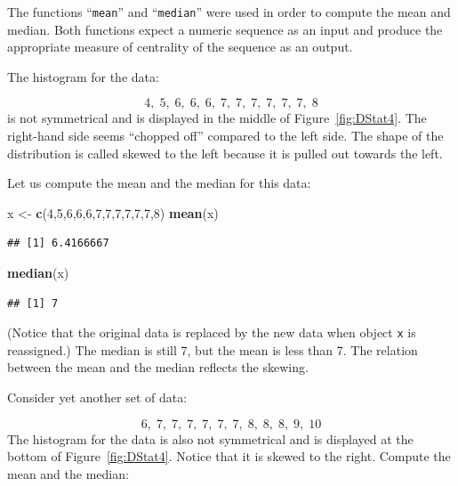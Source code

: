 \documentclass[]{krantz}
\makeatletter
\newenvironment{Shaded}{\begin{snugshade}}{\end{snugshade}}
\newcommand{\DecValTok}[1]{\textcolor[rgb]{0.00,0.00,0.81}{#1}}
\newcommand{\KeywordTok}[1]{\textcolor[rgb]{0.13,0.29,0.53}{\textbf{#1}}}
\newcommand{\NormalTok}[1]{#1}
\newcommand{\StringTok}[1]{\textcolor[rgb]{0.31,0.60,0.02}{#1}}
\newenvironment{kframe}{%
\medskip{}
\setlength{\fboxsep}{.8em}
 \def\at@end@of@kframe{}%
 \ifinner\ifhmode%
  \def\at@end@of@kframe{\end{minipage}}%
  \begin{minipage}{\columnwidth}%
 \fi\fi%
 \def\FrameCommand##1{\hskip\@totalleftmargin \hskip-\fboxsep
 \colorbox{shadecolor}{##1}\hskip-\fboxsep
     \hskip-\linewidth \hskip-\@totalleftmargin \hskip\columnwidth}%
 \MakeFramed {\advance\hsize-\width
   \@totalleftmargin\z@ \linewidth\hsize
   \@setminipage}}%
 {\par\unskip\endMakeFramed%
 \at@end@of@kframe}
\renewenvironment{Shaded}{\begin{kframe}}{\end{kframe}}
\theoremstyle{definition}
\theoremstyle{definition}
\theoremstyle{definition}
\theoremstyle{remark}
\makeatother
\begin{document}
The functions ``\texttt{mean}'' and ``\texttt{median}'' were used in order to compute the
mean and median. Both functions expect a numeric sequence as an input
and produce the appropriate measure of centrality of the sequence as an
output.

The histogram for the data:

\[4,\;  5,\;  6,\;  6,\;  6,\;  7,\;  7,\;  7,\;  7,\;  7,\;  7,\;  8\]
is not symmetrical and is displayed in the middle of
Figure~\ref{fig:DStat4}. The right-hand side seems ``chopped
off'' compared to the left side. The shape of the distribution is called
skewed to the left because it is pulled out towards the left.

Let us compute the mean and the median for this data:

\begin{Shaded}
\begin{Highlighting}[]
\NormalTok{x <-}\StringTok{ }\KeywordTok{c}\NormalTok{(}\DecValTok{4}\NormalTok{,}\DecValTok{5}\NormalTok{,}\DecValTok{6}\NormalTok{,}\DecValTok{6}\NormalTok{,}\DecValTok{6}\NormalTok{,}\DecValTok{7}\NormalTok{,}\DecValTok{7}\NormalTok{,}\DecValTok{7}\NormalTok{,}\DecValTok{7}\NormalTok{,}\DecValTok{7}\NormalTok{,}\DecValTok{7}\NormalTok{,}\DecValTok{8}\NormalTok{)}
\KeywordTok{mean}\NormalTok{(x)}
\end{Highlighting}
\end{Shaded}

\begin{verbatim}
## [1] 6.4166667
\end{verbatim}

\begin{Shaded}
\begin{Highlighting}[]
\KeywordTok{median}\NormalTok{(x)}
\end{Highlighting}
\end{Shaded}

\begin{verbatim}
## [1] 7
\end{verbatim}

(Notice that the original data is replaced by the new data when object
\texttt{x} is reassigned.) The median is still 7, but the mean is less than 7.
The relation between the mean and the median reflects the skewing.

Consider yet another set of data:

\[6,\;  7,\;  7,\;  7,\;  7,\;  7,\;  7,\;  8,\;  8,\;  8,\;  9,\;  10\]
The histogram for the data is also not symmetrical and is displayed at
the bottom of Figure~\ref{fig:DStat4}. Notice that it is
skewed to the right. Compute the mean and the median:
\end{document}
